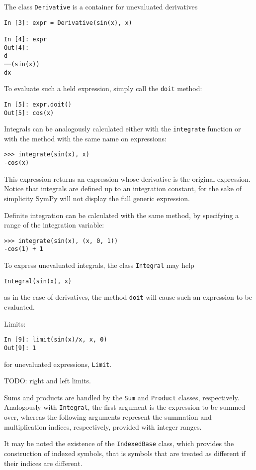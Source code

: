 The class \verb|Derivative| is a container for unevaluated derivatives

\begin{verbatim}
In [3]: expr = Derivative(sin(x), x)

In [4]: expr
Out[4]: 
d         
──(sin(x))
dx        
\end{verbatim}

To evaluate such a held expression, simply call the \verb|doit| method:

\begin{verbatim}
In [5]: expr.doit()
Out[5]: cos(x)
\end{verbatim}

Integrals can be analogously calculated either with the \verb|integrate| function
or with the method with the same name on expressions:
\begin{verbatim}
>>> integrate(sin(x), x)
-cos(x)
\end{verbatim}
This expression returns an expression whose derivative is the original expression.
Notice that integrals are defined up to an integration constant,
for the sake of simplicity SymPy will not display the full generic expression.

Definite integration can be calculated with the same method, by specifying a
range of the integration variable:
\begin{verbatim}
>>> integrate(sin(x), (x, 0, 1))
-cos(1) + 1
\end{verbatim}

To express unevaluated integrals, the class \verb|Integral| may help
\begin{verbatim}
Integral(sin(x), x)
\end{verbatim}
as in the case of derivatives, the method \verb|doit| will cause such an expression
to be evaluated.

Limits:
\begin{verbatim}
In [9]: limit(sin(x)/x, x, 0)
Out[9]: 1
\end{verbatim}
for unevaluated expressions, \verb|Limit|.

TODO: right and left limits.

Sums and products are handled by the \texttt{Sum} and \texttt{Product} classes,
respectively.
Analogously with \texttt{Integral}, the first argument is the expression to be
summed over, whereas the following arguments represent the summation and 
multiplication indices, respectively, provided with integer ranges.

It may be noted the existence of the \texttt{IndexedBase} class,
which provides the construction of indexed symbols, that is symbols that are
treated as different if their indices are different.


